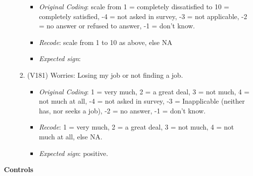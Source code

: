 \documentclass[]{article}
\begin{document}
\begin{enumerate}
\begin{enumerate}
    \begin{itemize} 
    \item \textit{Original Coding}: scale from 1 = completely dissatisfied to 10 = completely satisfied, -4 = not asked in survey, -3 = not applicable, -2 = no answer or refused to answer, -1 = don't know.
    \item \textit{Recode}: scale from 1 to 10 as above, else NA
    \item \textit{Expected sign}: 
    \end{itemize}
    \item (V181) Worries: Losing my job or not finding a job.
    \begin{itemize}
    \item \textit{Original Coding}: 1 = very much, 2 = a great deal, 3 = not much,  4 = not much at all, -4 = not asked in survey, -3 = Inapplicable (neither has, nor seeks a job), -2 = no answer, -1 = don't know.
    \item \textit{Recode}: 1 = very much, 2 = a great deal, 3 = not much,  4 = not much at all, else NA.
    \item \textit{Expected sign}: positive.
    \end{itemize}
  \end{enumerate}
\end{enumerate}

\textbf{Controls}
\end{document}
